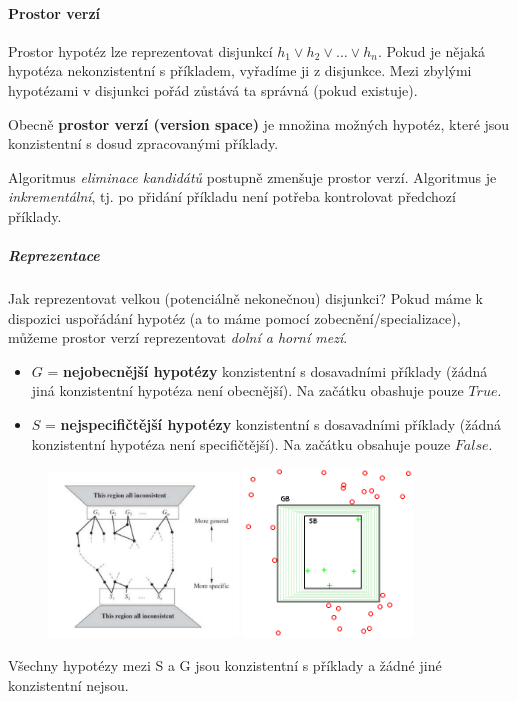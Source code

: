 \documentclass[11pt]{report} %
\numberwithin{equation}{section}
\begin{document}
\paragraph{Prostor verzí}
Prostor hypotéz lze reprezentovat disjunkcí $h_1 \vee h_2 \vee \dots \vee h_n$. Pokud je nějaká hypotéza nekonzistentní s příkladem, vyřadíme ji z disjunkce. Mezi zbylými hypotézami v disjunkci pořád zůstává ta správná (pokud existuje).

Obecně \textbf{prostor verzí (version space)} je množina možných hypotéz, které jsou konzistentní s dosud zpracovanými příklady.

Algoritmus \textit{eliminace kandidátů} postupně zmenšuje prostor verzí. Algoritmus je \textit{inkrementální}, tj. po přidání příkladu není potřeba kontrolovat předchozí příklady.

\subparagraph{Reprezentace}
Jak reprezentovat velkou (potenciálně nekonečnou) disjunkci? Pokud máme k dispozici uspořádání hypotéz (a to máme pomocí zobecnění/specializace), můžeme prostor verzí
reprezentovat \textit{dolní a horní mezí}.

\begin{itemize}
\item $G$ = \textbf{nejobecnější hypotézy} konzistentní s dosavadními příklady (žádná jiná konzistentní hypotéza není obecnější). Na začátku obashuje pouze $True$.

\item $S$ = \textbf{nejspecifičtější hypotézy} konzistentní s dosavadními příklady (žádná konzistentní hypotéza není specifičtější). Na začátku obsahuje pouze $False$.
\end{itemize}
\begin{figure}[H]
	\centering
	\includegraphics[width=0.45\textwidth]{img/version_space.png}
	\includegraphics[width=0.40\textwidth]{img/version_space2.png}
\end{figure}
Všechny hypotézy mezi S a G jsou konzistentní s příklady a žádné jiné konzistentní nejsou. 
\end{document}
